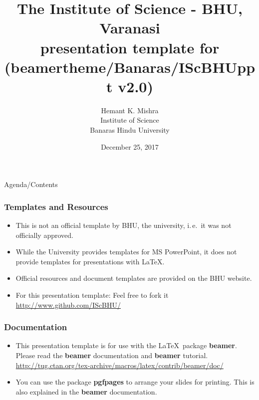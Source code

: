\documentclass[]{beamer} %
\author[]{\small{Hemant K. Mishra} \\ \tiny{Institute of Science} \\ \tiny{Banaras Hindu University} }%
\title[]{The Institute of Science - BHU, Varanasi \\ presentation template for \LaTeXe \\ (beamertheme/Banaras/IScBHUppt v2.0)}
\date{December 25, 2017} %
\begin{document}
\frame{\maketitle}
\begin{frame}{Agenda/Contents}%
\tableofcontents
\end{frame}



\begin{frame}
\frametitle{Templates and Resources}
	\begin{itemize}
	\item This is not an official template by BHU, the university,	i.\,e.\ it was not officially approved.
	\item While the University provides templates for MS PowerPoint, it does not provide templates for presentations with \LaTeX.
	\item Official resources and document templates are provided on the BHU website.
    \item For this presentation template: Feel free to fork it\\ 	
    {\small \url{http://www.github.com/IScBHU/}} \\
	\end{itemize}
\end{frame}

\begin{frame}
\frametitle{Documentation}
	\begin{itemize}
	\item This presentation template is for use
	with the \LaTeX\ package \textbf{beamer}.
	Please read the \textbf{beamer} documentation
	and  \textbf{beamer} tutorial.\\	
    {\tiny \url{http://tug.ctan.org/tex-archive/macros/latex/contrib/beamer/doc/}}
	\item You can use the package \textbf{pgfpages}
	to arrange your slides for printing. This is also explained
	in the \textbf{beamer} documentation.
	\end{itemize}
\end{frame}
\end{document}
